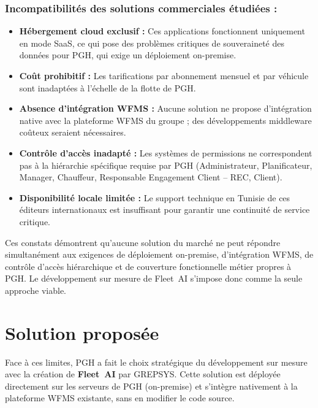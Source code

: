 \subsubsection*{Incompatibilités des solutions commerciales étudiées :}
\begin{itemize}
  \item[$\bullet$] \textbf{Hébergement cloud exclusif :} Ces applications fonctionnent uniquement en mode SaaS, ce qui pose des problèmes critiques de souveraineté des données pour PGH, qui exige un déploiement on-premise.
  \item[$\bullet$] \textbf{Coût prohibitif :} Les tarifications par abonnement mensuel et par véhicule sont inadaptées à l'échelle de la flotte de PGH.
  \item[$\bullet$] \textbf{Absence d'intégration WFMS :} Aucune solution ne propose d'intégration native avec la plateforme WFMS du groupe ; des développements middleware coûteux seraient nécessaires.
  \item[$\bullet$] \textbf{Contrôle d'accès inadapté :} Les systèmes de permissions ne correspondent pas à la hiérarchie spécifique requise par PGH (Administrateur, Planificateur, Manager, Chauffeur, Responsable Engagement Client -- REC, Client).
  \item[$\bullet$] \textbf{Disponibilité locale limitée :} Le support technique en Tunisie de ces éditeurs internationaux est insuffisant pour garantir une continuité de service critique.
\end{itemize}

Ces constats démontrent qu'aucune solution du marché ne peut répondre simultanément aux exigences de déploiement on-premise, d'intégration WFMS, de contrôle d'accès hiérarchique et de couverture fonctionnelle métier propres à PGH. Le développement sur mesure de Fleet~AI s'impose donc comme la seule approche viable.

\section{Solution proposée}

Face à ces limites, PGH a fait le choix stratégique du développement sur mesure avec la création de \textbf{Fleet~AI} par GREPSYS. Cette solution est déployée directement sur les serveurs de PGH (on-premise) et s'intègre nativement à la plateforme WFMS existante, sans en modifier le code source.

